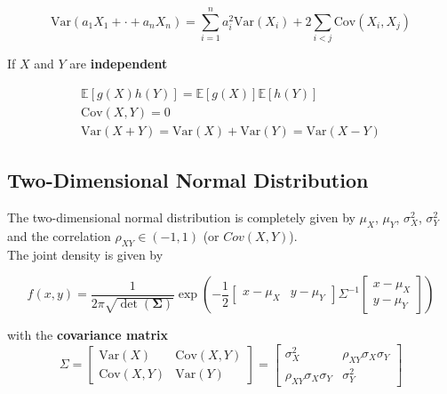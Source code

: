 \newpar{}

\begin{equation*}
    \mathrm{Var}(a_1 X_1+\cdot+a_n X_n) = \sum_{i=1}^{n}a_i^2\mathrm{Var}(X_i)+2\sum_{i<j}\mathrm{Cov}(X_i,X_j)
\end{equation*}

If $X$ and $Y$ are \textbf{independent}

\begin{gather*}
    \mathbb{E}[g(X)h(Y)] = \mathbb{E}[g(X)]\mathbb{E}[h(Y)] \\
    \mathrm{Cov}(X,Y) = 0 \\
    \mathrm{Var}(X+Y) = \mathrm{Var}(X) + \mathrm{Var}(Y) = \mathrm{Var}(X-Y)
\end{gather*}


\subsection{Two-Dimensional Normal Distribution}
The two-dimensional normal distribution is completely given by $\mu_X$, $\mu_Y$, $\sigma_X^2$, $\sigma_Y^2$ and the correlation $\rho_{XY}\in(-1,1)$ (or $Cov(X,Y)$).\\
The joint density is given by
\begin{footnotesize}
    \begin{equation*}
        f(x,y) = \frac{1}{2\pi\sqrt{\det(\bm{\Sigma})}}\exp\left(-\frac{1}{2}\begin{bmatrix}x-\mu_X & y-\mu_Y\end{bmatrix}\Sigma^{-1}\begin{bmatrix}x-\mu_X \\ y-\mu_Y \end{bmatrix}\right)
    \end{equation*}
\end{footnotesize}
with the \textbf{covariance matrix}
\begin{equation*}
    \Sigma = \begin{bmatrix}
        \mathrm{Var}(X)   & \mathrm{Cov}(X,Y) \\
        \mathrm{Cov}(X,Y) & \mathrm{Var}(Y)
    \end{bmatrix}
    =
    \begin{bmatrix}
        \sigma_X^2                & \rho_{XY}\sigma_X\sigma_Y \\
        \rho_{XY}\sigma_X\sigma_Y & \sigma_Y^2
    \end{bmatrix}
\end{equation*}

